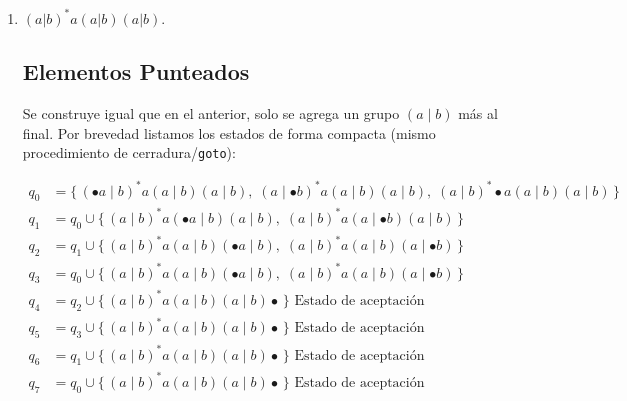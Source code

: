 \documentclass[12pt,letterpaper]{article}
\begin{document}
\begin{enumerate}[label=\arabic*.]
\begin{enumerate}
\begin{center}
  \end{center}
  
  \newpage
  
\item $(a|b)^*a(a|b)(a|b)$.

  \subsection*{Elementos Punteados}
  Se construye igual que en el anterior, solo se agrega un grupo $(a\mid b)$ más al final. Por brevedad
  listamos los estados de forma compacta (mismo procedimiento de cerradura/\texttt{goto}):
  
  \[
  \begin{aligned}
    q_0 &= \{\, (\bullet a\mid b)^*a(a\mid b)(a\mid b),\;(a\mid\bullet b)^*a(a\mid b)(a\mid b),\;(a\mid b)^*\bullet a(a\mid b)(a\mid b) \,\} \\
    q_1 &= q_0 \cup \{\, (a\mid b)^*a(\bullet a\mid b)(a\mid b),\;(a\mid b)^*a(a\mid\bullet b)(a\mid b) \,\} \\
    q_2 &= q_1 \cup \{\, (a\mid b)^*a(a\mid b)(\bullet a\mid b),\;(a\mid b)^*a(a\mid b)(a\mid\bullet b) \,\} \\
    q_3 &= q_0 \cup \{\, (a\mid b)^*a(a\mid b)(\bullet a\mid b),\;(a\mid b)^*a(a\mid b)(a\mid\bullet b) \,\} \\
    q_4 &= q_2 \cup \{\, (a\mid b)^*a(a\mid b)(a\mid b)\bullet \,\} \text{  Estado de aceptación} \\
    q_5 &= q_3 \cup \{\, (a\mid b)^*a(a\mid b)(a\mid b)\bullet \,\} \text{  Estado de aceptación} \\
    q_6 &= q_1 \cup \{\, (a\mid b)^*a(a\mid b)(a\mid b)\bullet \,\} \text{  Estado de aceptación} \\
    q_7 &= q_0 \cup \{\, (a\mid b)^*a(a\mid b)(a\mid b)\bullet \,\} \text{  Estado de aceptación}
  \end{aligned}
  \]


\end{enumerate}
\end{enumerate}
\end{document}

